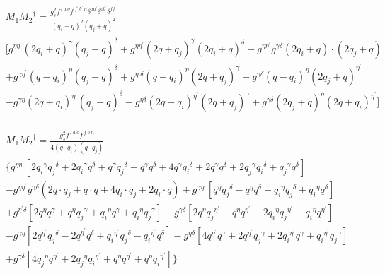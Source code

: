 \begin{equation}
\begin{split}
&M_1{M_2}^{\dagger}=\frac{g_s^2 f^{\:l\:a\:o} f^{\:f^{\prime}\: b^{\prime}\:n} \delta^{aa^{\prime}} \delta^{ob^{\prime}}\delta^{ff^{\prime}}}{(q_i +q)^2 (q_j +q)^2}\\
&[g^{{{\eta}}{{\eta}^{\prime}}}(2q_i+q)^{\gamma}(q_j-q)^{{\delta}}+g^{{{\eta}}{{\eta}^{\prime}}}(2q +q_j)^{\gamma}(2q_i+q)^{{\delta}}-g^{{{\eta}}{{\eta}^{\prime}}}g^{{{\gamma}}{{\delta}}}(2q_i+q)\cdot (2q_j+q)\\
&+g^{{{\gamma}}{{\eta}^{\prime}}}(q -q_i)^{\eta}(q_j-q)^{{\delta}}+g^{{{\eta}^{\prime}}{{\delta}}}(q -q_i)^{\eta}(2q +q_j)^{{\gamma}}
-g^{{{\gamma}}{{\delta}}}(q -q_i)^{\eta}(2q_j+q)^{{\eta}^{\prime}}\\
&-g^{{{\gamma}}{{\eta}}}(2q +q_i)^{{\eta}^{\prime}}(q_j-q)^{{\delta}}
-g^{{{\eta}}{{\delta}}}(2q +q_i)^{{\eta}^{\prime}}(2q +q_j)^{{\gamma}}
+g^{{{\gamma}}{{\delta}}}(2q_j+q)^{{\eta}}(2q +q_i)^{{\eta}^{\prime}}]\\
\end{split}
\end{equation}


\begin{equation}
\begin{split}
&M_1{M_2}^{\dagger}=\frac{g_s^2 f^{\:l\:a\:o} f^{\:f\: o\:n}}{4(q \cdot q_i) (q \cdot q_j)}\\
&\lbrace g^{{{\eta}}{{\eta}^{\prime}}}[2{q_i}^{{\gamma}}{q_j}^{\delta}+2{q_i}^{{\gamma}}{q}^{\delta}+{q}^{{\gamma}}{q_j}^{\delta}+{q}^{{\gamma}}{q}^{\delta}+4q^{{\gamma}}{q_i}^{\delta}+2q^{{\gamma}}{q}^{\delta}+2{q_j}^{{\gamma}}{q_i}^{\delta}+{q_j}^{{\gamma}}{q}^{\delta}]\\
&-g^{{{\eta}}{{\eta}^{\prime}}}g^{{{\gamma}}{{\delta}}}(2q\cdot q_j+ q\cdot q+4q_i \cdot q_j+2q_i \cdot q)+g^{{{\gamma}}{{\eta}^{\prime}}}[{q}^{{\eta}}{q_j}^{\delta}-{q}^{{\eta}}{q}^{\delta}-{q_i}^{{\eta}}{q_j}^{\delta}+{q_i}^{{\eta}}{q}^{\delta}]\\
&+g^{{{\eta}^{\prime}}{{\delta}}}[2{q}^{{\eta}}{q}^{\gamma}+{q}^{{\eta}}{q_j}^{\gamma}+{q_i}^{{\eta}}{q}^{\gamma}+{q_i}^{{\eta}}{q_j}^{\gamma}]-g^{{{\gamma}}{{\delta}}}[2{q}^{\eta}{q_j}^{{\eta}^{\prime}}+{q}^{\eta}{q}^{{\eta}^{\prime}}-2{q_i}^{\eta}{q_j}^{{\eta}^{\prime}}-{q_i}^{\eta}{q}^{{\eta}^{\prime}}]\\
&-g^{{{\gamma}}{{\eta}}}[2{q}^{{\eta}^{\prime}}{q_j}^{{\delta}}-{2q}^{{\eta}^{\prime}}{q}^{{\delta}}+{q_i}^{{\eta}^{\prime}}{q_j}^{{\delta}}-{q_i}^{{\eta}^{\prime}}{q}^{{\delta}}]-g^{{{\eta}}{{\delta}}}[4{q}^{{\eta}^{\prime}}{q}^{{\gamma}}+2{q}^{{\eta}^{\prime}}{q_j}^{{\gamma}}+2{q_i}^{{\eta}^{\prime}}{q}^{{\gamma}}+{q_i}^{{\eta}^{\prime}}{q_j}^{{\gamma}}]\\
&+g^{{{\gamma}}{{\delta}}}[4{q_j}^{{\eta}}{q}^{{\eta}^{\prime}}+2{q_j}^{{\eta}}{q_i}^{{\eta}^{\prime}}+{q}^{{\eta}}{q}^{{\eta}^{\prime}}+{q}^{{\eta}}{q_i}^{{\eta}^{\prime}}]\rbrace
\end{split}
\end{equation}



